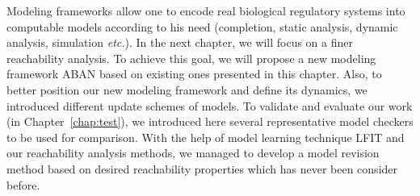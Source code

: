 Modeling frameworks allow one to encode real biological regulatory systems into computable models according to his need (completion, static analysis, dynamic analysis, simulation \textit{etc.}).
In the next chapter, we will focus on a finer reachability analysis.
To achieve this goal, we will propose a new modeling framework ABAN based on existing ones presented in this chapter.
Also, to better position our new modeling framework and define its dynamics, we introduced different update schemes of models.
To validate and evaluate our work (in Chapter~\ref{chap:test}), we introduced here several representative model checkers to be used for comparison.
With the help of model learning technique LFIT and our reachability analysis methods, we managed to develop a model revision method based on desired reachability properties which has never been consider before.